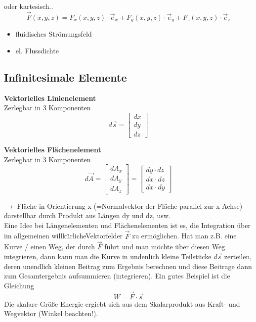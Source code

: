 \documentclass[11pt, a4paper]{article}
\begin{document}
oder kartesisch..
\[\vec{F}(x,y,z) = F_{x}(x,y,z)\cdot \vec{e}_{x} + F_{y}(x,y,z) \cdot \vec{e}_{y} + F_{z}(x,y,z) \cdot \vec{e}_{z}\]

\begin{itemize}

\item fluidisches Strömungsfeld
\item el. Flussdichte
\end{itemize}

\subsection{Infinitesimale Elemente}
\textbf{Vektorielles Linienelement}\\
Zerlegbar in 3 Komponenten
\[d\vec{s} = \begin{bmatrix}dx\\dy\\dz\end{bmatrix}\]

\noindent\textbf{Vektorielles Flächenelement}\\
Zerlegbar in 3 Komponenten
\[d\vec{A} = \begin{bmatrix}
    dA_{x}\\
    dA_{y}\\
    dA_{z}
  \end{bmatrix} = \begin{bmatrix}
    dy \cdot dz\\
    dx \cdot dz\\
    dx \cdot dy
  \end{bmatrix}\]

$\rightarrow$ Fläche in Orientierung x (=Normalvektor der Fläche parallel zur x-Achse) darstellbar durch Produkt aus Längen dy und dz, usw.\\

Eine Idee bei Längenelementen und Flächenelementen ist es, die Integration über im allgemeinen \glqq willkürliche\grqq Vektorfelder $\vec{F}$\grqq{} zu ermöglichen. Hat man z.B. eine Kurve / einen Weg, der durch $\vec{F}$ führt und man möchte über diesen Weg integrieren, dann kann man die Kurve in undenlich kleine Teilstücke $d\vec{s}$ zerteilen, deren unendlich kleinen Beitrag zum Ergebnis berechnen und diese Beitrage dann zum Gesamtergebnis aufsummieren (integrieren). Ein gutes Beispiel ist die Gleichung
\[W = \vec{F} \cdot \vec{s}\]
Die skalare Größe Energie ergiebt sich aus dem Skalarprodukt aus Kraft- und Wegvektor (Winkel beachten!).
\end{document}
